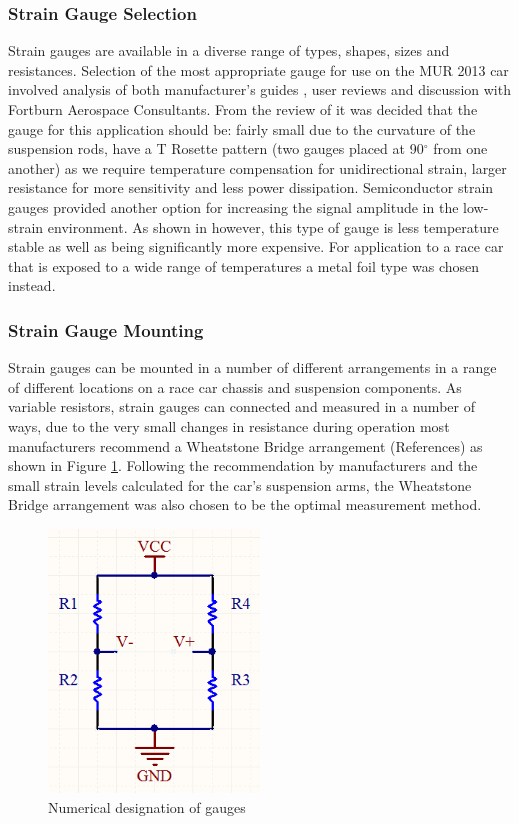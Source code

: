 \subsubsection{Strain Gauge Selection}
Strain gauges are available in a diverse range of types, shapes, sizes and resistances. Selection of the most appropriate gauge for use on the MUR 2013 car involved analysis of both manufacturer's guides \cite{Text_13}\cite{Text_14}, user reviews \cite{Text_15} and discussion with Fortburn Aerospace Consultants. From the review of \cite{Text_15} it was decided that the gauge for this application should be: fairly small due to the curvature of the suspension rods, have a T Rosette pattern (two gauges placed at 90$^\circ$ from one another) as we require temperature compensation for unidirectional strain, larger resistance for more sensitivity and less power dissipation. Semiconductor strain gauges provided another option for increasing the signal amplitude in the low-strain environment. As shown in \cite{Text_13} however, this type of gauge is less temperature stable as well as being significantly more expensive. For application to a race car that is exposed to a wide range of temperatures a metal foil type was chosen instead.

\subsubsection{Strain Gauge Mounting}
Strain gauges can be mounted in a number of different arrangements in a range of different locations on a race car chassis and suspension components. As variable resistors, strain gauges can connected and measured in a number of ways, due to the very small changes in resistance during operation most manufacturers recommend a Wheatstone Bridge arrangement (References) as shown in Figure \ref{fig:IMG_SG_Wheatstone_Numbers}. Following the recommendation by manufacturers and the small strain levels calculated for the car's suspension arms, the Wheatstone Bridge arrangement was also chosen to be the optimal measurement method.\\

\begin{figure}[h!]
	\centering
	\includegraphics[width=0.5\textwidth]{./Images/Strain_Gauges/IMG_SG_Wheatstone_Numbers.png}
	\caption{Numerical designation of gauges \cite{Text_9}}
	\label{fig:IMG_SG_Wheatstone_Numbers}
\end{figure}

